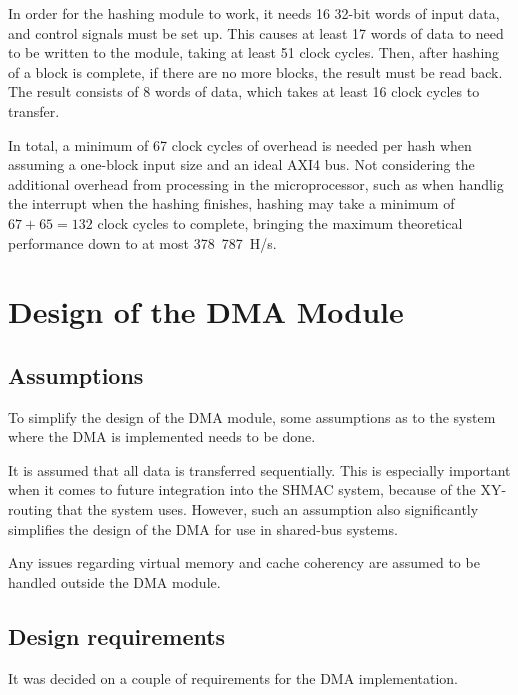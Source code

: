 In order for the hashing module to work, it needs 16 32-bit words of input data,
and control signals must be set up. This causes at least 17 words of data to
need to be written to the module, taking at least 51 clock cycles. Then, after
hashing of a block is complete, if there are no more blocks, the result must
be read back. The result consists of 8 words of data, which takes at least 16
clock cycles to transfer.

In total, a minimum of 67 clock cycles of overhead is needed per hash when assuming
a one-block input size and an ideal AXI4 bus. Not considering the additional overhead
from processing in the microprocessor, such as when handlig the interrupt when the
hashing finishes, hashing may take a minimum of $67 + 65 = 132$ clock cycles to
complete, bringing the maximum theoretical performance down to at most 378~787~H/s.

\section{Design of the DMA Module}
\label{sec:dma-architecture}

\subsection{Assumptions}
To simplify the design of the DMA module, some assumptions as to the system where the
DMA is implemented needs to be done.

It is assumed that all data is transferred sequentially. 
This is especially important when it comes to future integration into the SHMAC system, because of the XY-routing that the system uses.
However, such an assumption also significantly simplifies the design of the DMA for use in shared-bus systems.

Any issues regarding virtual memory and cache coherency are assumed to be handled outside the DMA module.

\subsection{Design requirements}

It was decided on a couple of requirements for the DMA implementation.

